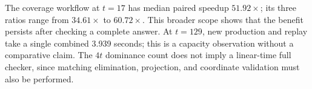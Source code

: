 The coverage workflow at $t=17$ has median paired speedup $51.92\times$;
its three ratios range from $34.61\times$ to $60.72\times$. This broader
scope shows that the benefit persists after checking a complete answer.
At $t=129$, new production and replay take a single combined 3.939 seconds;
this is a capacity observation without a comparative claim. The $4t$
dominance count does not imply a linear-time full checker, since matching
elimination, projection, and coordinate validation must also be performed.


